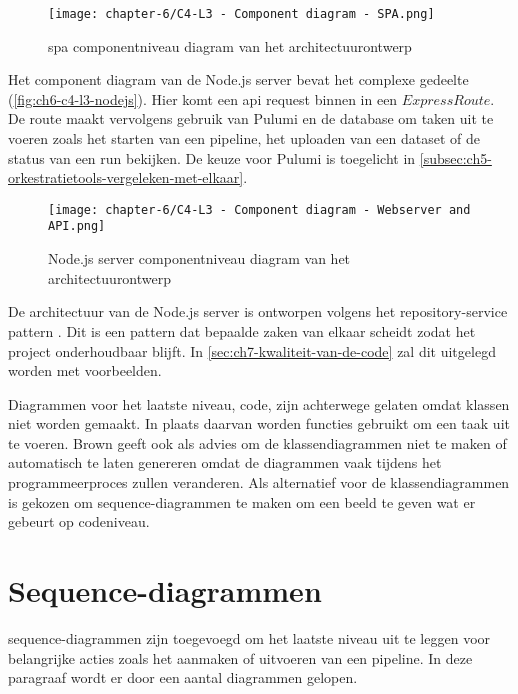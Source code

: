 \begin{figure}[hbt!]
  \centering
  \texttt{[image: chapter-6/C4-L3 - Component diagram - SPA.png]}
  \caption{\Acrfull{spa} componentniveau diagram van het architectuurontwerp}
  \label{fig:ch6-c4-l3-spa}
\end{figure}

Het component diagram van de Node.js server bevat het complexe gedeelte (\autoref{fig:ch6-c4-l3-nodejs}). Hier komt een \acrshort{api} request binnen in een \(Express Route\). De route maakt vervolgens gebruik van Pulumi en de database om taken uit te voeren zoals het starten van een pipeline, het uploaden van een dataset of de status van een run bekijken. De keuze voor Pulumi is toegelicht in \autoref{subsec:ch5-orkestratietools-vergeleken-met-elkaar}.

\newpage

\begin{figure}[hbt!]
  \centering
  \texttt{[image: chapter-6/C4-L3 - Component diagram - Webserver and API.png]}
  \caption{Node.js server componentniveau diagram van het architectuurontwerp}
  \label{fig:ch6-c4-l3-nodejs}
\end{figure}

De architectuur van de Node.js server is ontworpen volgens het repository-service pattern \cite{repository-service-pattern}. Dit is een pattern dat bepaalde zaken van elkaar scheidt zodat het project onderhoudbaar blijft. In \autoref{sec:ch7-kwaliteit-van-de-code} zal dit uitgelegd worden met voorbeelden.

Diagrammen voor het laatste niveau, code, zijn achterwege gelaten omdat klassen niet worden gemaakt. In plaats daarvan worden functies gebruikt om een taak uit te voeren. Brown geeft ook als advies om de klassendiagrammen niet te maken of automatisch te laten genereren \cite{c4-model-faq} omdat de diagrammen vaak tijdens het programmeerproces zullen veranderen. Als alternatief voor de klassendiagrammen is gekozen om sequence-diagrammen te maken om een beeld te geven wat er gebeurt op codeniveau.

\section{Sequence-diagrammen}\label{sec:ch6-sequence-diagrammen}
sequence-diagrammen zijn toegevoegd om het laatste niveau uit te leggen voor belangrijke acties zoals het aanmaken of uitvoeren van een pipeline. In deze paragraaf wordt er door een aantal diagrammen gelopen.

